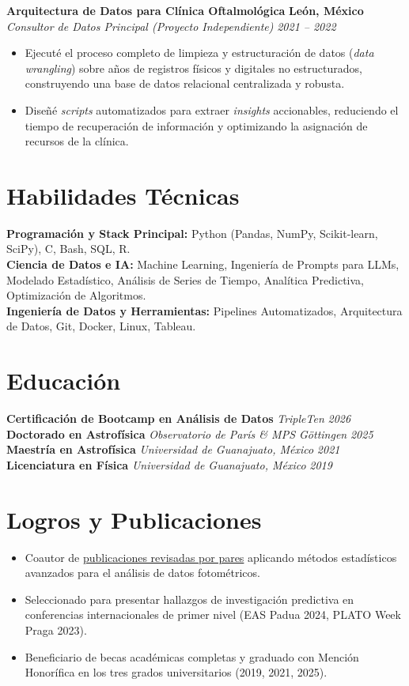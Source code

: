 \documentclass[10pt,a4paper]{article}
\begin{document}
\textbf{Arquitectura de Datos para Clínica Oftalmológica} \hfill \textbf{León, México} \\
\textit{Consultor de Datos Principal (Proyecto Independiente)} \hfill \textit{2021 -- 2022}
\begin{itemize}[leftmargin=1.5em]
    \item Ejecuté el proceso completo de limpieza y estructuración de datos (\textit{data wrangling}) sobre años de registros físicos y digitales no estructurados, construyendo una base de datos relacional centralizada y robusta.
    \item Diseñé \textit{scripts} automatizados para extraer \textit{insights} accionables, reduciendo el tiempo de recuperación de información y optimizando la asignación de recursos de la clínica.
\end{itemize}

\section*{Habilidades Técnicas}
\textbf{Programación y Stack Principal:} Python (Pandas, NumPy, Scikit-learn, SciPy), C, Bash, SQL, R. \\
\textbf{Ciencia de Datos e IA:} Machine Learning, Ingeniería de Prompts para LLMs, Modelado Estadístico, Análisis de Series de Tiempo, Analítica Predictiva, Optimización de Algoritmos. \\
\textbf{Ingeniería de Datos y Herramientas:} Pipelines Automatizados, Arquitectura de Datos, Git, Docker, Linux, Tableau.

\section*{Educación}
\textbf{Certificación de Bootcamp en Análisis de Datos} \hfill \textit{TripleTen} \hfill \textit{2026}\\
\textbf{Doctorado en Astrofísica} \hfill \textit{Observatorio de París \& MPS Göttingen} \hfill \textit{2025}\\
\textbf{Maestría en Astrofísica} \hfill \textit{Universidad de Guanajuato, México} \hfill \textit{2021}\\
\textbf{Licenciatura en Física} \hfill \textit{Universidad de Guanajuato, México} \hfill \textit{2019}

\section*{Logros y Publicaciones}
\begin{itemize}[leftmargin=1.5em]
    \item Coautor de \href{https://ui.adsabs.harvard.edu/search/fq...}{publicaciones revisadas por pares} aplicando métodos estadísticos avanzados para el análisis de datos fotométricos.
    \item Seleccionado para presentar hallazgos de investigación predictiva en conferencias internacionales de primer nivel (EAS Padua 2024, PLATO Week Praga 2023).
    \item Beneficiario de becas académicas completas y graduado con Mención Honorífica en los tres grados universitarios (2019, 2021, 2025).
\end{itemize}
\end{document}
